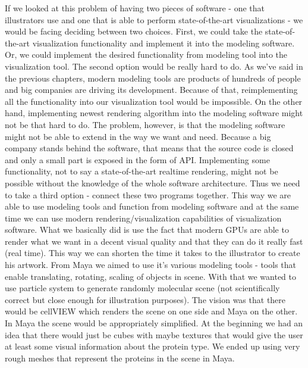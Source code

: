 \documentclass[
  digital, %
  table,   %
  lof,     %
  lot,     %
]{fithesis3}
\begin{document}
{If we looked at this problem of having two pieces of software - one that illustrators use and one that is able to perform state-of-the-art visualizations - we would be facing deciding between two choices. First, we could take the state-of-the-art visualization functionality and implement it into the modeling software. Or, we could implement the desired functionality from modeling tool into the visualization tool. The second option would be really hard to do. As we've said in the previous chapters, modern modeling tools are products of hundreds of people and big companies are driving its development. Because of that, reimplementing all the functionality into our visualization tool would be impossible. On the other hand, implementing newest rendering algorithm into the modeling software might not be that hard to do. The problem, however, is that the modeling software might not be able to extend in the way we want and need. Because a big company stands behind the software, that means that the source code is closed and only a small part is exposed in the form of API. Implementing some functionality, not to say a state-of-the-art realtime rendering, might not be possible without the knowledge of the whole software architecture. Thus we need to take a third option - connect these two programs together. This way we are able to use modeling tools and function from modeling software and at the same time we can use modern rendering/visualization capabilities of visualization software.
What we basically did is use the fact that modern GPUs are able to render what we want in a decent visual quality and that they can do it really fast (real time). This way we can shorten the time it takes to the illustrator to create his artwork.
From Maya we aimed to use it's various modeling tools - tools that enable translating, rotating, scaling of objects in scene. With that we wanted to use particle system to generate randomly molecular scene (not scientifically correct but close enough for illustration purposes).
The vision was that there would be cellVIEW which renders the scene on one side and Maya on the other. In Maya the scene would be appropriately simplified. At the beginning we had an idea that there would just be cubes with maybe textures that would give the user at least some visual information about the protein type. We ended up using very rough meshes that represent the proteins in the scene in Maya.
}
\end{document}
